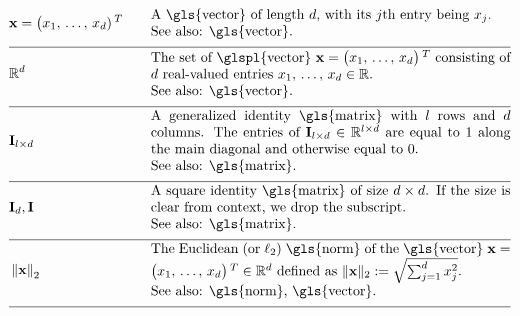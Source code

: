 \begin{align} 
	 &\featurevec=\big(\feature_{1}, \,\ldots, \,\feature_{\featuredim})\,^{T} &\quad & \parbox{.75\textwidth}{A \gls{vector} of length $\featuredim$, with its 
		$\featureidx$th entry being $\feature_{\featureidx}$.
		\\ See also: \gls{vector}. } \nonumber \\[2mm] \hline \nonumber\\[-5mm]
	&\mathbb{R}^{\featuredim} & \quad &  \parbox{.75\textwidth}{The set of \glspl{vector} $\featurevec=\big(\feature_{1}, \,\ldots, \,\feature_{\featurelen}\big)\,^{T}$ 
		consisting of $\featuredim$ real-valued entries $\feature_{1}, \,\ldots, \,\feature_{\featurelen} \in \mathbb{R}$.
		\\ See also: \gls{vector}. } \nonumber \\[2mm] \hline \nonumber\\[-5mm]
	&\mathbf{I}_{\modelidx \times \featuredim}  & \quad &  \parbox{.75\textwidth}{A generalized identity \gls{matrix} 
		with $\modelidx$ rows and $\featuredim$ columns. The entries of $\mathbf{I}_{\modelidx \times \featuredim} \in \mathbb{R}^{\modelidx \times \featuredim}$ 
		are equal to $1$ along the main diagonal and otherwise equal to $0$. 
		\\ See also: \gls{matrix}. }\nonumber \\[2mm] \hline \nonumber\\[-5mm] %
	&\mathbf{I}_{\dimlocalmodel}, \mathbf{I} & \quad &  \parbox{.75\textwidth}{A square identity 
		\gls{matrix} of size $\dimlocalmodel \times \dimlocalmodel$. If the size is clear from context, we drop the subscript.
		\\ See also: \gls{matrix}. } \nonumber \\[2mm] \hline \nonumber\\[-5mm]
	&\normgeneric{\featurevec}{2}  &\quad & \parbox{.75\textwidth}{The Euclidean (or $\ell_{2}$) \gls{norm} of the \gls{vector} 
		$\featurevec=\big(\feature_{1}, \,\ldots, \,\feature_{\featurelen}\big)\,^{T} \in \mathbb{R}^{\featuredim}$ defined as 
		$\| \featurevec \|_{2} \defeq \sqrt{\sum_{\featureidx=1}^{\featuredim} \feature_{\featureidx}^{2}}$.
		\\ See also: \gls{norm}, \gls{vector}. } \nonumber \\[2mm] \hline \nonumber\\[-5mm] 

\end{align}
